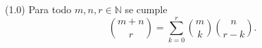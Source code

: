 
(1.0) Para todo $m,n,r\in\mathbb{N}$ se cumple
\[
  \binom{m+n}{r} = \sum_{k=0}^{r} \binom{m}{k}\binom{n}{r-k}.
\]
